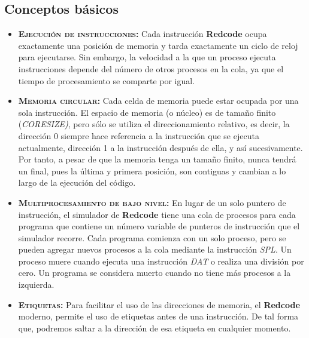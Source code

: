 \subsection{Conceptos básicos}
\noindent
\begin{itemize}
    \item \textbf{\textsc{Ejecución de instrucciones:}}
        \newline Cada instrucción \textbf{Redcode} ocupa exactamente una posición de memoria y tarda exactamente un ciclo de reloj para ejecutarse. 
        \newline Sin embargo, la velocidad a la que un proceso ejecuta instrucciones depende del número de otros procesos en la cola, ya que el tiempo de procesamiento se comparte por igual.
    
    \item \textbf{\textsc{Memoria circular:}}
        \newline Cada celda de memoria puede estar ocupada por una sola instrucción. El espacio de memoria (o núcleo) es de tamaño finito (\textit{CORESIZE)}, pero sólo se utiliza el direccionamiento relativo, es decir, la dirección 0 siempre hace referencia a la instrucción que se ejecuta actualmente, dirección 1 a la instrucción después de ella, y así sucesivamente. 
        \newline Por tanto, a pesar de que la memoria tenga un tamaño finito, nunca tendrá un final, pues la última y primera posición, son contiguas y cambian a lo largo de la ejecución del código.
        
    \item \textbf{\textsc{Multiprocesamiento de bajo nivel:}}
        \newline En lugar de un solo puntero de instrucción, el simulador de \textbf{Redcode} tiene una cola de procesos para cada programa que contiene un número variable de punteros de instrucción que el simulador recorre. 
        \newline Cada programa comienza con un solo proceso, pero se pueden agregar nuevos procesos a la cola mediante la instrucción \textit{SPL}. Un proceso muere cuando ejecuta una instrucción \textit{DAT} o realiza una división por cero. Un programa se considera muerto cuando no tiene más procesos a la izquierda. 
        
        \newpage
        \item \textbf{\textsc{Etiquetas:}}
        \newline Para facilitar el uso de las direcciones de memoria, el \textbf{Redcode} moderno, permite el uso de etiquetas antes de una instrucción. De tal forma que, podremos saltar a la dirección de esa etiqueta en cualquier momento.
\end{itemize}